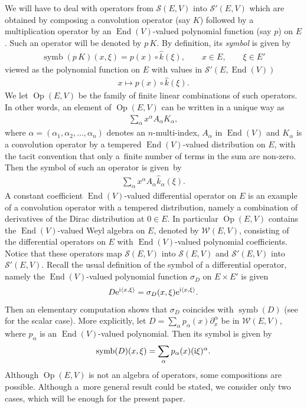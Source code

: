 \documentclass[pdftex]{sigma}
\DeclareMathOperator{\End}{End}
\DeclareMathOperator{\Op}{Op}
\DeclareMathOperator{\symb}{symb}
\numberwithin{equation}{section}
\begin{document}
We will have to deal with operators from $\mathcal S(E,V)$ into $\mathcal S'(E,V)$ which are obtained by composing a convolution operator (say $K$) followed by a multiplication operator by an $\End(V)$-valued polynomial function (say $p$) on $E$. Such an operator will be denoted by $p\,K$. By definition, its \emph{symbol} is given by
\begin{gather*}
\symb(p\,K) (x,\xi) = p(x)\circ \widehat k(\xi),\qquad x\in E,\qquad \xi\in E'
\end{gather*}
viewed as the polynomial function on $E$ with values in $\mathcal S'(E,\End(V))$
\begin{gather*}
x\mapsto p(x)\circ \widehat k(\xi) .
\end{gather*}
We let $\Op(E,V)$ be the family of finite linear combinations of such operators. In other words, an element of $\Op(E,V)$ can be written in a unique way as
\begin{gather*}
\sum_\alpha x^\alpha A_\alpha K_\alpha,
\end{gather*}
where $\alpha=(\alpha_1,\alpha_2,\dots, \alpha_n)$ denotes an $n$-multi-index, $A_\alpha$ in $\End(V)$ and $K_\alpha$ is a convolution operator by a tempered $\End(V)$-valued distribution on $E$, with the tacit convention that only a~finite number of terms in the sum are non-zero. Then the symbol of such an operator is given~by
\begin{gather*}
\sum_\alpha x^\alpha A_\alpha \widehat k_\alpha(\xi) .
\end{gather*}
A constant coefficient $\End(V)$-valued differential operator on $E$ is an example of a convolution operator with a tempered distribution, namely a combination of derivatives of the Dirac distribution at $0\in E$.
In particular $\Op(E,V)$ contains the $\End(V)$-valued Weyl algebra on $E$, denoted by $\mathcal W(E,V)$, consisting of the differential operators on $E$ with $\End(V)$-valued polynomial coef\-ficients. Notice that these operators map $\mathcal S(E,V)$ into $\mathcal S(E,V)$ and $\mathcal S'(E,V)$ into $\mathcal S'(E,V)$. Recall the usual definition of the symbol of a differential operator, namely the $\End(V)$-valued polynomial function $\sigma_D$ on $E\times E'$ is given
\begin{gather*}
D {\rm e}^{{\rm i}\langle x,\xi\rangle} = \sigma_D(x,\xi){\rm e}^{{\rm i}\langle x,\xi\rangle} .
\end{gather*}
Then an elementary computation shows that $\sigma_D$ coincides with $\symb(D)$ (see~\cite{c19} for the scalar case). More explicitly, let $D=\sum_\alpha p_\alpha(x) \partial_x^\alpha$ be in $\mathcal W(E,V)$, where $p_\alpha$ is an $\End(V)$-valued polynomial. Then its symbol is given by
\begin{gather*}
\symb(D)(x,\xi) = \sum_\alpha p_\alpha(x)({\rm i}\xi)^\alpha .
\end{gather*}
Although $\Op(E,V)$ is not an algebra of operators, some compositions are possible. Although a~more general result could be stated, we consider only two cases, which will be enough for the present paper.
\end{document}
